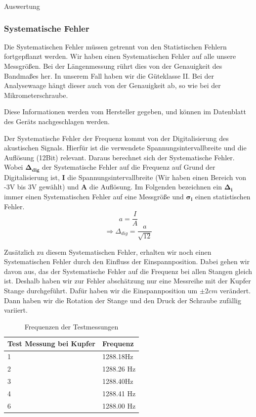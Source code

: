 \documentclass[twoside]{protokoll}
\begin{document}
\begin{aufgabe}{Auswertung}
\subsubsection{Systematische Fehler}
Die Systematischen Fehler müssen getrennt von den Statistischen Fehlern fortgepflanzt werden.
Wir haben einen Systematischen Fehler auf alle unsere Messgrößen.
Bei der Längenmessung rührt dies von der Genauigkeit des Bandmaßes her.
In unserem Fall haben wir die Güteklasse II.
Bei der Analysewaage  hängt dieser auch von der Genauigkeit ab, so wie bei der Mikrometerschraube. 
 
Diese Informationen werden vom Hersteller gegeben, und können im Datenblatt des Geräts nachgeschlagen werden. 

Der Systematische Fehler der Frequenz kommt von der Digitalisierung des akustischen Signals. Hierfür ist die verwendete Spannungsintervallbreite und die Auflösung (12Bit) relevant. Daraus berechnet sich der Systematische Fehler. \\
 Wobei $ \pmb{\Delta_{dig}} $ der Systematische Fehler auf die Frequenz auf Grund der Digitalisierung ist, \textbf{I} die Spannungsintervallbreite (Wir haben einen Bereich von -3V bis 3V gewählt) und \textbf{A} die Auflösung. Im Folgenden bezeichnen ein $\pmb{\Delta_i}$ immer einen Systematischen Fehler auf eine Messgröße und $ \pmb{\sigma_i}$ einen statistischen Fehler.\\ 
\begin{equation}
         a = \frac{I}{A}
    \end{equation}
\begin{equation}
         \Rightarrow 
         \Delta_{dig} = \frac{a}{\sqrt{12}}
\end{equation}

Zusätzlich zu diesem Systematischen Fehler, erhalten wir noch einen Systematischen Fehler durch den Einfluss der Einspannposition.
Dabei gehen wir davon aus, das der Systematische Fehler auf die Frequenz bei allen Stangen gleich ist.
Deshalb haben wir zur Fehler abschätzung nur eine Messreihe mit der Kupfer Stange durchgeführt.
Dafür haben wir die Einspannposition um $\pm{2cm}$ verändert.
Dann haben wir die Rotation der Stange und den Druck der Schraube zufällig variiert.
 

\begin{table}[H]
    \centering
    \begin{tabularx}{0.7\textwidth}{X l} %
        \toprule
        \textbf{Test Messung bei Kupfer} & \textbf{Frequenz} \\
        \midrule
            1 & 1288.18Hz \\
            2 & 1288.26 Hz \\
            3 & 1288.40Hz \\
            4 & 1288.41 Hz \\
            6 & 1288.00 Hz \\
        \bottomrule
    \end{tabularx}
    \caption{Frequenzen der Testmessungen}
    \label{tab:mytable}
\end{table}


\end{aufgabe}
\end{document}
